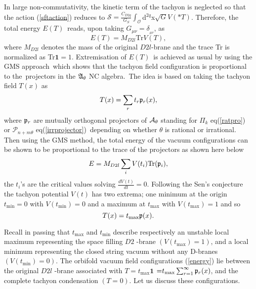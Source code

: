 \documentclass[a4paper,12pt]{article}
\begin{document}
In large non-commutativity, the kinetic term of the tachyon is neglected so
that the action (\ref{sftaction}) reduces to $\mathcal{S}=\frac{C_{D2q}}{G_{S}}\int_{\mathcal{O}}$d$^{2q}$x$\sqrt{G}%
V\left( \ast T\right) $. Therefore, the total energy $E(T)$\ reads, upon
taking $G_{\mu \nu }=\delta _{_{\mu \nu }}$, as
\begin{equation}
E(T)=M_{D2l}\text{Tr}V(T),
\end{equation}
where $M_{D2l}$ denotes the mass of the original $D2l$-brane and
the trace Tr is normalized as Tr$\mathbf{1}=1$. Extremisation of
$E(T)$\ is achieved as usual by using the GMS approach\ which
shows that the tachyon field
configuration is proportional to the\ projectors in the $\frak{A}_{\mathbf{%
\theta }}$ NC algebra.\ The idea is based on taking the tachyon
field $T(x)$ as
\begin{equation}
T(x)=\sum_{r}t_{r}\frak{p}_{r}(x),
\end{equation}
where $\frak{p}_{r}\frak{\ }$are mutually orthogonal projectors of $\mathcal{%
A}_{\theta }$ standing for $\Pi _{k}$ eq(\ref{ratpro}) or $\mathcal{P}%
_{n+m\theta }$ eq(\ref{irrprojector})\ depending on whether
$\theta $ is rational or irrational. Then using the GMS method,
the total energy of the vacuum configurations can be shown to be
proportional to the trace of the projectors as shown here below
\begin{equation}
E=M_{D2l}\sum_{i}V(t_{i})\text{Tr}(\frak{p}_{i}),  \label{energy}
\end{equation}
the $t_{i}$'s are the critical values solving $\frac{dV(t)}{dt}=0$.
Following the Sen's conjecture the tachyon potential $V(t)$ has two extrema;
one minimum at the origin $t_{\text{min}}=0$ with $V(t_{\text{min}})=0$ and
a maximum at $t_{\text{max}}$ with $V(t_{\text{max}})=1$ and so
\begin{equation}\label{tsolution}
T(x)=t_{\text{max}}\frak{p}(x).
\end{equation}

Recall in passing that $t_{\text{max}}$ and $t_{\text{min}}$ describe
respectively an unstable local maximum representing the space filling $D2$%
-brane $(V(t_{\text{max}})=1)$, and a local minimum representing the closed
string vacuum without any D-branes $(V(t_{\text{min}})=0)$. The orbifold
vacuum field configurations (\ref{energy}) lie between the original $D2l$%
-brane associated with $T=t_{\text{max}}\mathbf{1}$ $\mathbf{=}t_{\text{max}%
}\sum_{r=1}^{\infty }\frak{p}_{r}(x)$, and the complete tachyon condensation
$\left( T=0\right) $. Let us discuss these configurations.
\end{document}
